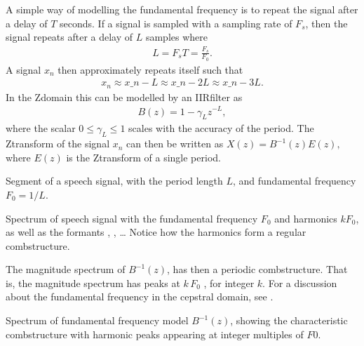 \documentclass[letterpaper,10pt,english]{jupyterBook}
\begin{document}
\sphinxAtStartPar
A simple way of modelling the fundamental frequency is to repeat the
signal after a delay of \(T\) seconds. If a signal is sampled with a
sampling rate of \(F_{s}\), then the signal repeats after a delay
of \(L\) samples where
\begin{equation*}
\begin{split} L = F_s T = \frac{F_s}{F_0}. \end{split}
\end{equation*}
\sphinxAtStartPar
A signal \(x_{n}\) then approximately repeats itself such that
\begin{equation*}
\begin{split} x_n \approx x\_{n-L} \approx x\_{n-2L} \approx x\_{n-3L}. \end{split}
\end{equation*}
\sphinxAtStartPar
In the Z\sphinxhyphen{}domain this can be modelled by an IIR\sphinxhyphen{}filter as
\begin{equation*}
\begin{split} B(z) = 1 - \gamma_L z^{-L}, \end{split}
\end{equation*}
\sphinxAtStartPar
where the scalar \( 0\leq\gamma_L\leq 1 \) scales with the accuracy
of the period. The Z\sphinxhyphen{}transform of the signal \(x_{n}\) can then be
written as \( X(z)=B^{-1}(z) E(z), \) where \(E(z)\) is the Z\sphinxhyphen{}transform
of a single period.

\sphinxAtStartPar
Segment of a speech signal, with the period length \(L\), and fundamental
frequency \(F_0=1/L\).

\sphinxAtStartPar
Spectrum of speech signal with the fundamental frequency \(F_{0}\)
and harmonics \(kF_{0}\), as well as the
formants , , … Notice how the harmonics form a regular
comb\sphinxhyphen{}structure.

\sphinxAtStartPar
{}

\sphinxAtStartPar
The magnitude spectrum of \(B^{-1}(z)\), has then a periodic
comb\sphinxhyphen{}structure. That is, the magnitude spectrum has peaks at \( k\,F_0
\) , for integer \(k\).
For a discussion about the fundamental frequency in the cepstral
domain, see .

\sphinxAtStartPar
Spectrum of fundamental frequency model \(B^{-1}(z)\), showing the
characteristic comb\sphinxhyphen{}structure with harmonic peaks appearing at integer
multiples of \(F0\).
\end{document}
